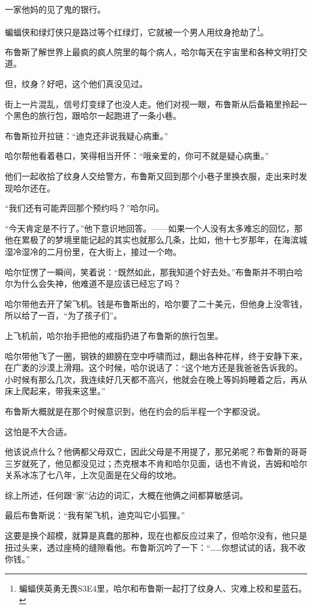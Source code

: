 \documentclass[../main]{subfiles}
\begin{document}
一家他妈的见了鬼的银行。

蝙蝠侠和绿灯侠只是路过等个红绿灯，它就被一个男人用纹身抢劫了\footnote[1]{蝙蝠侠英勇无畏S3E4里，哈尔和布鲁斯一起打了纹身人、灾难上校和星蓝石。}。

布鲁斯了解世界上最疯的疯人院里的每个病人，哈尔每天在宇宙里和各种文明打交道。

但，纹身？好吧，这个他们真没见过。

街上一片混乱，信号灯变绿了也没人走。他们对视一眼，布鲁斯从后备箱里拎起一个黑色的旅行包，跟哈尔一起跑进了一条小巷。

布鲁斯拉开拉链：“迪克还非说我疑心病重。”

哈尔帮他看着巷口，笑得相当开怀：“哦亲爱的，你可不就是疑心病重。”

他们一起收拾了纹身人交给警方，布鲁斯又回到那个小巷子里换衣服，走出来时发现哈尔还在。

“我们还有可能弄回那个预约吗？”哈尔问。

“今天肯定是不行了。”他下意识地回答。——如果一个人没有太多难忘的回忆，那他在累极了的梦境里能记起的其实也就那么几条，比如，他十七岁那年，在海滨城湿冷湿冷的二月份里，在大街上，接过一个吻。

哈尔怔愣了一瞬间，笑着说：“既然如此，那我知道个好去处。”布鲁斯并不明白哈尔为什么会失神，他难道不是应该已经忘了吗？

哈尔带他去开了架飞机。钱是布鲁斯出的，哈尔要了二十美元，但他身上没零钱，所以给了一百，“为了孩子们”。

上飞机前，哈尔抬手把他的戒指扔进了布鲁斯的旅行包里。

哈尔带他飞了一圈，钢铁的翅膀在空中呼啸而过，翻出各种花样，终于安静下来，在广袤的沙漠上滑翔。这个时候，哈尔说话了：“这个地方还是我爸爸告诉我的。小时候有那么几次，我连续好几天都不高兴，他就会在晚上等妈妈睡着之后，再从床上爬起来，带我来这里。”

布鲁斯大概就是在那个时候意识到，他在约会的后半程一个字都没说。

这怕是不大合适。

他该说点什么？他俩都父母双亡，因此父母是不用提了，那兄弟呢？布鲁斯的哥哥三岁就死了，他见都没见过；杰克根本不肯和哈尔见面，话也不肯说，吉姆和哈尔关系冰冻了七八年，上次见面是在父母的坟地。

综上所述，任何跟“家”沾边的词汇，大概在他俩之间都算敏感词。

最后布鲁斯说：“我有架飞机，迪克叫它小狐狸。”

这要是换个超模，就算是真蠢的那种，现在也都反应过来了，但哈尔没有，他只是扭过头来，透过座椅的缝隙看他。布鲁斯沉吟了一下：“……你想试试的话，我不收你钱。”
\end{document}
